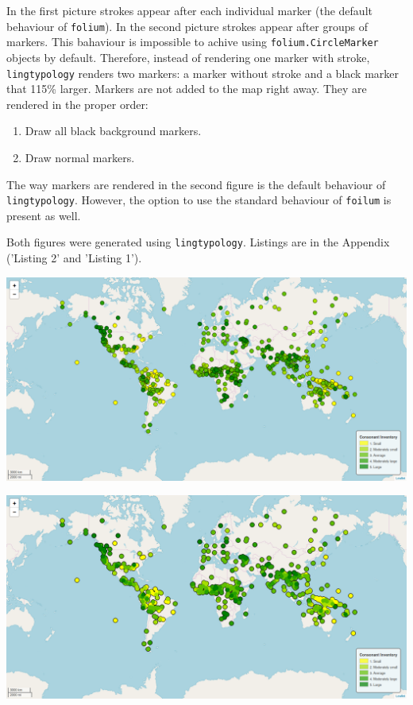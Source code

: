 \documentclass[a4paper,12pt]{article}
\begin{document}
In the first picture strokes appear after each individual marker (the default behaviour of \texttt{folium}).
In the second picture strokes appear after groups of markers. This bahaviour is impossible to achive using \texttt{folium.CircleMarker} objects by default. Therefore, instead of rendering one marker with stroke, \texttt{lingtypology} renders two markers: a marker without stroke and a black marker that 115\% larger. Markers are not added to the map right away. They are rendered in the proper order:
\begin{enumerate}
 \item Draw all black background markers.
 \item Draw normal markers.
\end{enumerate}

The way markers are rendered in the second figure is the default behaviour of \texttt{lingtypology}. However, the option to use the standard behaviour of \texttt{foilum} is present as well.

Both figures were generated using \texttt{lingtypology}. Listings are in the Appendix ('Listing 2' and 'Listing 1').
\bigskip

\noindent
\begin{minipage}{\textwidth}
\includegraphics[width=\textwidth]{images/FoliumStrokeAppearance.png}
\bigskip
\end{minipage}

\noindent
\begin{minipage}{\textwidth}
\includegraphics[width=\textwidth]{images/LingtypologyStrokeAppearance.png}
\bigskip
\end{minipage}
\end{document}
